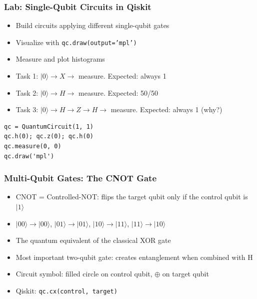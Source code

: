 \begin{frame}[fragile]\frametitle{Lab: Single-Qubit Circuits in Qiskit}
\begin{itemize}
\item Build circuits applying different single-qubit gates
\item Visualize with \texttt{qc.draw(output='mpl')}
\item Measure and plot histograms
\item Task 1: $|0\rangle \to X \to$ measure. Expected: always 1
\item Task 2: $|0\rangle \to H \to$ measure. Expected: 50/50
\item Task 3: $|0\rangle \to H \to Z \to H \to$ measure. Expected: always 1 (why?)
\end{itemize}
\begin{verbatim}
qc = QuantumCircuit(1, 1)
qc.h(0); qc.z(0); qc.h(0)
qc.measure(0, 0)
qc.draw('mpl')
\end{verbatim}
\end{frame}

\begin{frame}[fragile]\frametitle{Multi-Qubit Gates: The CNOT Gate}
\begin{itemize}
\item CNOT = Controlled-NOT: flips the target qubit only if the control qubit is $|1\rangle$
\item $|00\rangle \to |00\rangle$, $|01\rangle \to |01\rangle$, $|10\rangle \to |11\rangle$, $|11\rangle \to |10\rangle$
\item The quantum equivalent of the classical XOR gate
\item Most important two-qubit gate: creates entanglement when combined with H
\item Circuit symbol: filled circle on control qubit, $\oplus$ on target qubit
\item Qiskit: \texttt{qc.cx(control, target)}
\end{itemize}
\end{frame}

